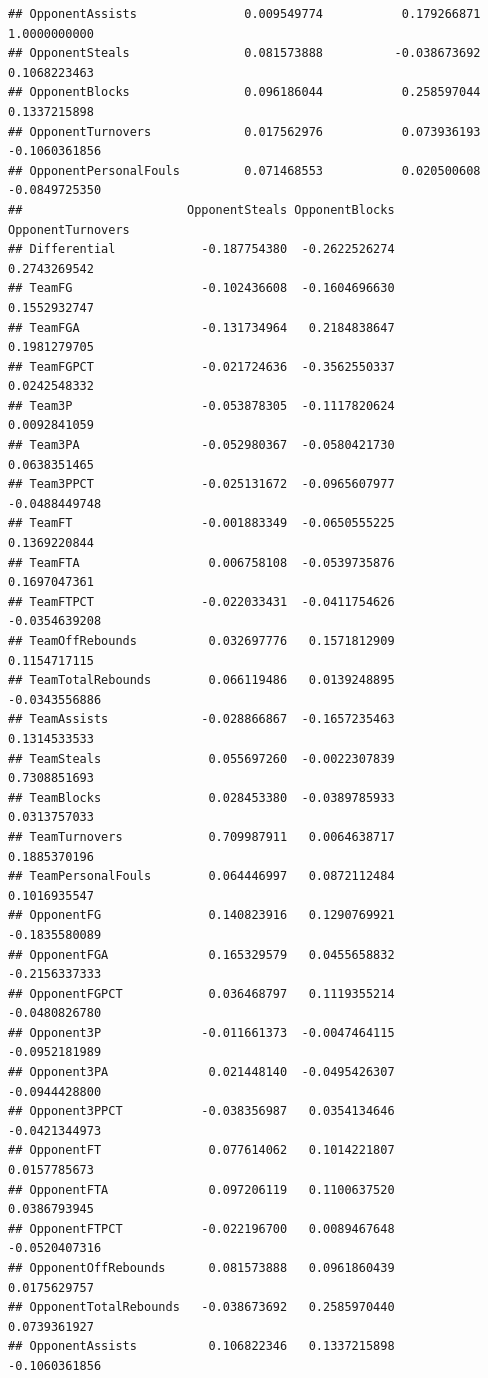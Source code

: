 \documentclass[
]{book}
\begin{document}
\begin{verbatim}
## OpponentAssists               0.009549774           0.179266871    1.0000000000
## OpponentSteals                0.081573888          -0.038673692    0.1068223463
## OpponentBlocks                0.096186044           0.258597044    0.1337215898
## OpponentTurnovers             0.017562976           0.073936193   -0.1060361856
## OpponentPersonalFouls         0.071468553           0.020500608   -0.0849725350
##                       OpponentSteals OpponentBlocks OpponentTurnovers
## Differential            -0.187754380  -0.2622526274      0.2743269542
## TeamFG                  -0.102436608  -0.1604696630      0.1552932747
## TeamFGA                 -0.131734964   0.2184838647      0.1981279705
## TeamFGPCT               -0.021724636  -0.3562550337      0.0242548332
## Team3P                  -0.053878305  -0.1117820624      0.0092841059
## Team3PA                 -0.052980367  -0.0580421730      0.0638351465
## Team3PPCT               -0.025131672  -0.0965607977     -0.0488449748
## TeamFT                  -0.001883349  -0.0650555225      0.1369220844
## TeamFTA                  0.006758108  -0.0539735876      0.1697047361
## TeamFTPCT               -0.022033431  -0.0411754626     -0.0354639208
## TeamOffRebounds          0.032697776   0.1571812909      0.1154717115
## TeamTotalRebounds        0.066119486   0.0139248895     -0.0343556886
## TeamAssists             -0.028866867  -0.1657235463      0.1314533533
## TeamSteals               0.055697260  -0.0022307839      0.7308851693
## TeamBlocks               0.028453380  -0.0389785933      0.0313757033
## TeamTurnovers            0.709987911   0.0064638717      0.1885370196
## TeamPersonalFouls        0.064446997   0.0872112484      0.1016935547
## OpponentFG               0.140823916   0.1290769921     -0.1835580089
## OpponentFGA              0.165329579   0.0455658832     -0.2156337333
## OpponentFGPCT            0.036468797   0.1119355214     -0.0480826780
## Opponent3P              -0.011661373  -0.0047464115     -0.0952181989
## Opponent3PA              0.021448140  -0.0495426307     -0.0944428800
## Opponent3PPCT           -0.038356987   0.0354134646     -0.0421344973
## OpponentFT               0.077614062   0.1014221807      0.0157785673
## OpponentFTA              0.097206119   0.1100637520      0.0386793945
## OpponentFTPCT           -0.022196700   0.0089467648     -0.0520407316
## OpponentOffRebounds      0.081573888   0.0961860439      0.0175629757
## OpponentTotalRebounds   -0.038673692   0.2585970440      0.0739361927
## OpponentAssists          0.106822346   0.1337215898     -0.1060361856

\end{verbatim}
\end{document}
